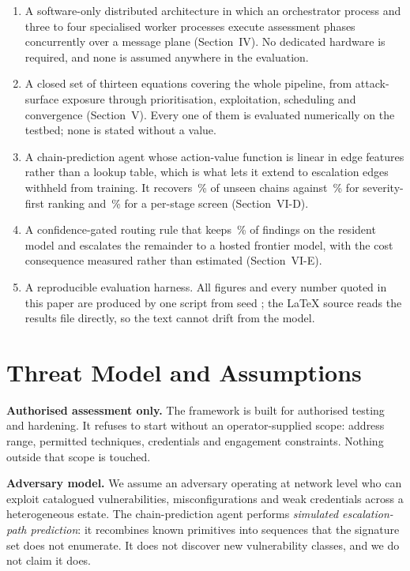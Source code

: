 \documentclass[journal]{IEEEtran}
\begin{document}
\begin{enumerate}
  \item A software-only distributed architecture in which an orchestrator
        process and three to four specialised worker processes execute
        assessment phases concurrently over a message plane
        (Section~IV). No dedicated hardware is required, and none is assumed
        anywhere in the evaluation.
  \item A closed set of thirteen equations covering the whole pipeline, from
        attack-surface exposure through prioritisation, exploitation,
        scheduling and convergence (Section~V). Every one of them is evaluated
        numerically on the testbed; none is stated without a value.
  \item A chain-prediction agent whose action-value function is linear in edge
        features rather than a lookup table, which is what lets it extend to
        escalation edges withheld from training. It recovers \rlRate\,\% of
        unseen chains against \heurRate\,\% for severity-first ranking and
        \stageRate\,\% for a per-stage screen (Section~VI-D).
  \item A confidence-gated routing rule that keeps \escFrac\,\% of findings on
        the resident model and escalates the remainder to a hosted frontier
        model, with the cost consequence measured rather than
        estimated (Section~VI-E).
  \item A reproducible evaluation harness. All figures and every number
        quoted in this paper are produced by one script from seed
        \seedVal; the LaTeX source reads the results file directly, so the
        text cannot drift from the model.
\end{enumerate}

\section{Threat Model and Assumptions}

\textbf{Authorised assessment only.} The framework is built for authorised
testing and hardening. It refuses to start without an operator-supplied scope:
address range, permitted techniques, credentials and engagement constraints.
Nothing outside that scope is touched.

\textbf{Adversary model.} We assume an adversary operating at network level
who can exploit catalogued vulnerabilities, misconfigurations and weak
credentials across a heterogeneous estate. The chain-prediction agent performs
\emph{simulated escalation-path prediction}: it recombines known primitives
into sequences that the signature set does not enumerate. It does not discover
new vulnerability classes, and we do not claim it does.
\end{document}
